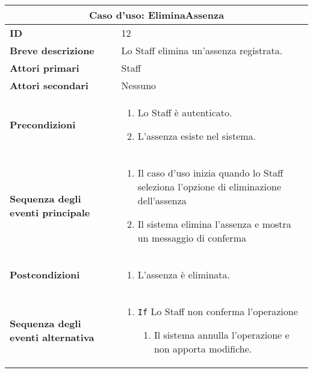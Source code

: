 \documentclass[a4paper]{report}
\begin{document}
\clearpage
\begin{table}[H]
\vspace*{-0cm}
\renewcommand{\arraystretch}{1.9}
\begin{tabular}{|p{3.9cm}|p{9.9cm}|}
\hline
\multicolumn{2}{|c|}{\textbf{Caso d’uso: EliminaAssenza}} \\ \hline
\textbf{ID} & 12 \\ \hline
\textbf{Breve descrizione} & Lo Staff elimina un’assenza registrata. \\ \hline
\textbf{Attori primari} & Staff \\ \hline
\textbf{Attori secondari} & Nessuno \\ \hline
\textbf{Precondizioni} & \begin{enumerate}[leftmargin=14pt,label=\arabic*.,labelsep=0.5em,topsep=0pt,partopsep=0pt,parsep=0pt,itemsep=0pt]
    \item Lo Staff è autenticato.
    \item L’assenza esiste nel sistema.
\end{enumerate} \\ \hline
\textbf{Sequenza degli eventi principale} & \begin{enumerate}[leftmargin=14pt,label=\arabic*.,labelsep=0.5em,topsep=0pt,partopsep=0pt,parsep=0pt,itemsep=0pt]
    \item Il caso d'uso inizia quando lo Staff seleziona l'opzione di eliminazione dell'assenza
    \item Il sistema elimina l'assenza e mostra un messaggio di conferma
\end{enumerate} \\ \hline
\textbf{Postcondizioni} & \begin{enumerate}[label=\arabic*.,leftmargin=14pt,labelsep=0.5em,topsep=0pt,partopsep=0pt,parsep=0pt,itemsep=0pt]
        \item L’assenza è eliminata.
\end{enumerate} \\ \hline
\textbf{Sequenza degli eventi alternativa} & \begin{enumerate}[leftmargin=14pt,label=\arabic*.,labelsep=0.5em,topsep=0pt,partopsep=0pt,parsep=0pt,itemsep=0pt]
    \item \texttt{If} Lo Staff non conferma l’operazione
    \begin{enumerate}[label=\arabic{enumi}.\arabic*.,leftmargin=22pt,labelsep=0.5em,topsep=0pt,partopsep=0pt,parsep=0pt,itemsep=0pt]
        \item Il sistema annulla l’operazione e non apporta modifiche.
    \end{enumerate}
\end{enumerate} \\ \hline
\end{tabular}
\end{table}
\end{document}
